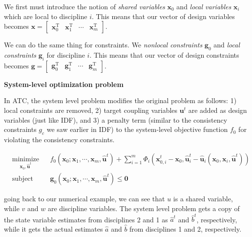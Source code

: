 \documentclass[11pt]{article}
\begin{document}
We first must introduce the notion of \emph{shared variables}
\(\mathbf{x}_0\) and \emph{local variables} \(\mathbf{x}_i\) which are
local to discipline \(i\). This means that our vector of design
variables becomes
\(\mathbf{x} = \begin{bmatrix} \mathbf{x}_0^\mathrm{T} & \mathbf{x}_1^\mathrm{T} & \cdots & \mathbf{x}_m^\mathrm{T} \end{bmatrix}\).

We can do the same thing for constraints. We \emph{nonlocal constraints}
\(\mathbf{g}_0\) and \emph{local constraints} \(\mathbf{g}_i\) for
discipline \(i\). This means that our vector of design constraints
becomes
\(\mathbf{g} = \begin{bmatrix} \mathbf{g}_0^\mathrm{T} & \mathbf{g}_1^\mathrm{T} & \cdots & \mathbf{g}_m^\mathrm{T} \end{bmatrix}\).

\textbf{System-level optimization problem}

In ATC, the system level problem modifies the original problem as
follows: 1) local constraints are removed, 2) target coupling variables
\(\mathbf{u}^t\) are added as design variables (just like IDF), and 3) a
penalty term (similar to the consistency constraints \(g_c\) we saw
earlier in IDF) to the system-level objective function \(f_0\) for
violating the consistency constraints.

\begin{equation*}
    \begin{aligned}
        & \underset{\mathbf{x}_0,\hat{\mathbf{u}}^t}{\text{minimize}}
        & & f_0(\mathbf{x}_0;\mathbf{x}_1,\cdots,\mathbf{x}_m,\hat{\mathbf{u}}^t) + \sum_{i=1}^m \Phi_i(\mathbf{x}_{0,i}^t - \mathbf{x}_{0}, \hat{\mathbf{u}}_{i}^t - \hat{\mathbf{u}}_{i}(\mathbf{x}_0,\mathbf{x}_i,\hat{\mathbf{u}}^t))\\
        & \text{subject to}
        & & \mathbf{g}_{0}(\mathbf{x}_0;\mathbf{x}_1,\cdots,\mathbf{x}_m,\hat{\mathbf{u}}^t) \leq \mathbf{0}
    \end{aligned}
    \tag{7}
\end{equation*}

going back to our numerical example, we can see that \(u\) is a shared
variable, while \(v\) and \(w\) are discipline variables. The system
level problem gets a copy of the state variable estimates from
disciplines 2 and 1 as \(\hat{a}^t\) and \(\hat{b}^t\), respectively,
while it gets the actual estimates \(\hat{a}\) and \(\hat{b}\) from
disciplines 1 and 2, respectively.
\end{document}
